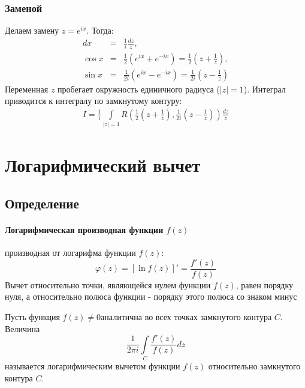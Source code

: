 \documentclass[12pt]{extarticle}
\begin{document}
\subsubsection{Заменой}
Делаем замену $z=e^{ix}$. Тогда:
\begin{eqnarray*}
    dx&=&\frac{1}{i}\frac{dz}{z}
    ,\\ \cos{x}&=&\frac{1}{2}\left(e^{ix}+e^{-ix}\right)
=\frac{1}{2}\left(z+\frac{1}{z}\right)
    ,\\ \sin{x}&=&\frac{1}{2i}\left(e^{ix}-e^{-ix}\right)
=\frac{1}{2i}\left(z-\frac{1}{z}\right)
\end{eqnarray*}
Переменная $z$ пробегает окружность единичного радиуса
($\left|z\right|=1$). Интеграл приводится к интегралу по замкнутому
контуру:
\begin{eqnarray*}
I=\frac{1}{i}\int\limits_{\left|z\right|=1}
R\left(\frac{1}{2}\left(z+\frac{1}{z}\right),
\frac{1}{2i}\left(z-\frac{1}{z}\right)\right)
\frac{dz}{z}
\end{eqnarray*}

\section{Логарифмический вычет}
\subsection{Определение}
\paragraph{Логарифмическая производная функции $f(z)$}
производная от логарифма функции $f(z)$:
\begin{displaymath}
    \varphi(z)=\left[\ln f(z)\right]'=\frac{f'(z)}{f(z)}
\end{displaymath}
Вычет относительно точки, являющейся нулем функции $f(z)$, равен порядку
нуля, а относительно полюса функции - порядку этого полюса со знаком
минус
\par Пусть функция $f(z)\neq 0$аналитична во всех точках замкнутого
контура $C$. Величина
\begin{displaymath}
    \frac{1}{2\pi i}\int\limits_{C}\frac{f'(z)}{f(z)}dz
\end{displaymath}
называется логарифмическим вычетом функции $f(z)$ относительно
замкнутого контура $C$.
\end{document}
